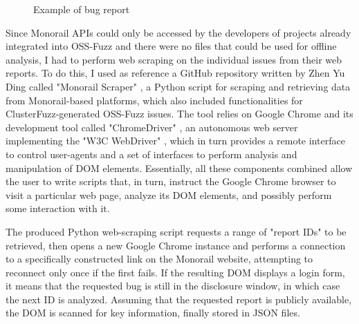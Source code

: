 \begin{figure}[h]
\caption{Example of bug report \cite{ossfuzz_bugtracker}}
\label{fig:issue}
\end{figure}

Since Monorail APIs could only be accessed by the developers of projects already integrated into OSS-Fuzz and there were no files that could be used for offline analysis, I had to perform web scraping on the individual issues from their web reports. To do this, I used as reference a GitHub repository written by Zhen Yu Ding called "Monorail Scraper" \cite{scraper}, a Python script for scraping and retrieving data from Monorail-based platforms, which also included functionalities for ClusterFuzz-generated OSS-Fuzz issues. The tool relies on Google Chrome and its development tool called "ChromeDriver" \cite{driver}, an autonomous web server implementing the "W3C WebDriver" \cite{driver_standard}, which in turn provides a remote interface to control user-agents and a set of interfaces to perform analysis and manipulation of DOM elements. Essentially, all these components combined allow the user to write scripts that, in turn, instruct the Google Chrome browser to visit a particular web page, analyze its DOM elements, and possibly perform some interaction with it.


\newpage
The produced Python web-scraping script requests a range of "report IDs" to be retrieved, then opens a new Google Chrome instance and performs a connection to a specifically constructed link on the Monorail website, attempting to reconnect only once if the first fails. If the resulting DOM displays a login form, it means that the requested bug is still in the disclosure window, in which case the next ID is analyzed. Assuming that the requested report is publicly available, the DOM is scanned for key information, finally stored in JSON files. 
\newline

